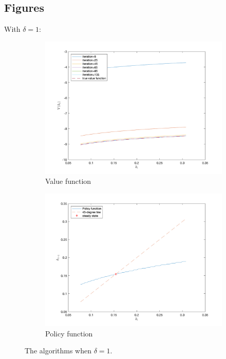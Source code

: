 \documentclass[10pt,a4paper]{article}
\begin{document}
\newpage
\subsection{Figures}
With $\delta=1$:

\begin{figure}[ht]
\centering
\begin{subfigure}[b]{0.49\linewidth}
\includegraphics[width=\linewidth]{figs/delta1valfun.png}
\caption{Value function}
\end{subfigure}
\begin{subfigure}[b]{0.49\linewidth}
\includegraphics[width=\linewidth]{figs/delta1policyfun.png}
\caption{Policy function}
\end{subfigure}
\caption{The algorithms when $\delta=1$.}
\label{fig:delta1}
\end{figure}
\end{document}
